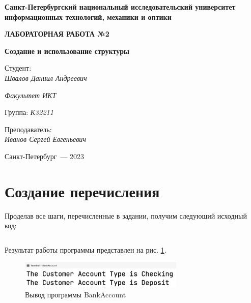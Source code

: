 \documentclass[a4paper,14pt]{extarticle}
\numberwithin{figure}{section}
\begin{document}
\begin{titlepage}
    \vspace{0pt plus2fill}
    \noindent

    \vspace{0pt plus6fill}
    \begin{center}
        \textbf{\large{Санкт-Петербургский национальный исследовательский университет информационных
                технологий, механики и оптики}}

        \vspace{0pt plus2fill}
        \textbf{\Large{ЛАБОРАТОРНАЯ РАБОТА №2}}

        \vspace{0pt plus2fill}
        \textbf{\large{Создание и использование структуры}}
    \end{center}

    \vspace{0pt plus8fill}
    \begin{flushright}
        Студент: \\
        \textit{Швалов Даниил Андреевич}

        \textit{Факультет ИКТ}

        Группа: \textit{К32211}

        Преподаватель: \\
        \textit{Иванов Сергей Евгеньевич}
    \end{flushright}

    \vspace{0pt plus4fill}
    \begin{center}
        {Санкт-Петербург~--- 2023}
    \end{center}
\end{titlepage}

\section{Создание перечисления}

Проделав все шаги, перечисленные в задании, получим следующий исходный код:

\inputminted{csharp}{../BankAccount/BankAccount/Program.cs}

Результат работы программы представлен на рис. \ref{fig:task-1}.

\begin{figure}[H]
    \centering
    \includegraphics[width=0.7\textwidth]{images/task-1.png}
    \caption{Вывод программы BankAccount}
    \label{fig:task-1}
\end{figure}
\end{document}
